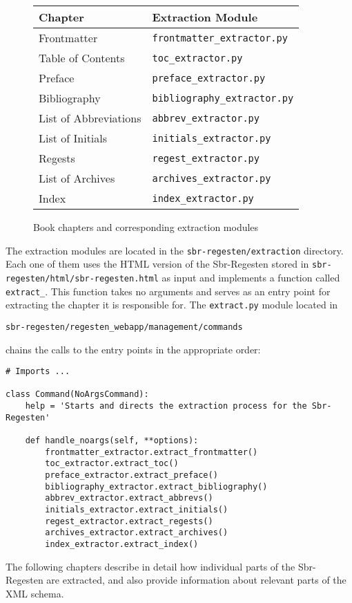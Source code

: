 \begin{figure}[h]
  \centering
  \begin{tabular}{l|l}
    \hline
    Chapter & Extraction Module \\
    \hline
    Frontmatter & \texttt{frontmatter\_extractor.py} \\
    Table of Contents & \texttt{toc\_extractor.py} \\
    Preface & \texttt{preface\_extractor.py} \\
    Bibliography & \texttt{bibliography\_extractor.py} \\
    List of Abbreviations & \texttt{abbrev\_extractor.py} \\
    List of Initials & \texttt{initials\_extractor.py} \\
    Regests & \texttt{regest\_extractor.py} \\
    List of Archives & \texttt{archives\_extractor.py} \\
    Index & \texttt{index\_extractor.py} \\
    \hline
  \end{tabular}
  \caption{Book chapters and corresponding extraction modules}
  \label{fig:extraction-modules}
\end{figure}

The extraction modules are located in the
\texttt{sbr-regesten/extraction} directory. Each one of them uses the
HTML version of the Sbr-Regesten stored in
\texttt{sbr-regesten/html/sbr-regesten.html} as input and implements a
function called \texttt{extract\_<part-of-book>}. This function takes
no arguments and serves as an entry point for extracting the chapter
it is responsible for. The \texttt{extract.py} module located in

\begin{verbatim}
sbr-regesten/regesten_webapp/management/commands
\end{verbatim}

chains the calls to the entry points in the appropriate order:

\begin{verbatim}
# Imports ...

class Command(NoArgsCommand):
    help = 'Starts and directs the extraction process for the Sbr-Regesten'

    def handle_noargs(self, **options):
        frontmatter_extractor.extract_frontmatter()
        toc_extractor.extract_toc()
        preface_extractor.extract_preface()
        bibliography_extractor.extract_bibliography()
        abbrev_extractor.extract_abbrevs()
        initials_extractor.extract_initials()
        regest_extractor.extract_regests()
        archives_extractor.extract_archives()
        index_extractor.extract_index()
\end{verbatim}

The following chapters describe in detail how individual parts of the
Sbr-Regesten are extracted, and also provide information about
relevant parts of the XML schema.
